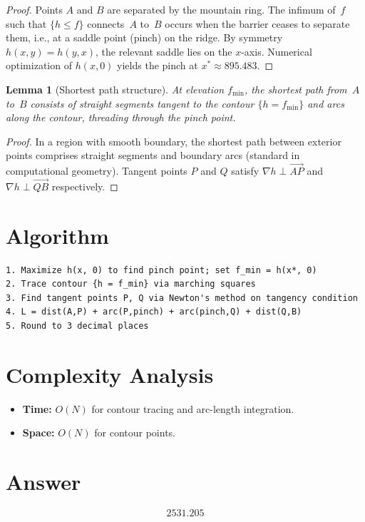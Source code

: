 \documentclass[12pt]{article}
\newtheorem{lemma}[theorem]{Lemma}
\begin{document}
\begin{proof}
Points $A$ and $B$ are separated by the mountain ring. The infimum of~$f$ such that $\{h\le f\}$ connects~$A$ to~$B$ occurs when the barrier ceases to separate them, i.e., at a saddle point (pinch) on the ridge. By symmetry $h(x,y)=h(y,x)$, the relevant saddle lies on the $x$-axis. Numerical optimization of $h(x,0)$ yields the pinch at $x^*\approx 895.483$.
\end{proof}

\begin{lemma}[Shortest path structure]
At elevation $f_{\min}$, the shortest path from~$A$ to~$B$ consists of straight segments tangent to the contour $\{h=f_{\min}\}$ and arcs along the contour, threading through the pinch point.
\end{lemma}

\begin{proof}
In a region with smooth boundary, the shortest path between exterior points comprises straight segments and boundary arcs (standard in computational geometry). Tangent points $P$ and $Q$ satisfy $\nabla h \perp \overrightarrow{AP}$ and $\nabla h \perp \overrightarrow{QB}$ respectively.
\end{proof}

\section{Algorithm}

\begin{verbatim}
1. Maximize h(x, 0) to find pinch point; set f_min = h(x*, 0)
2. Trace contour {h = f_min} via marching squares
3. Find tangent points P, Q via Newton's method on tangency condition
4. L = dist(A,P) + arc(P,pinch) + arc(pinch,Q) + dist(Q,B)
5. Round to 3 decimal places
\end{verbatim}

\section{Complexity Analysis}

\begin{itemize}
\item \textbf{Time:} $O(N)$ for contour tracing and arc-length integration.
\item \textbf{Space:} $O(N)$ for contour points.
\end{itemize}

\section{Answer}

\[
\boxed{2531.205}
\]
\end{document}
